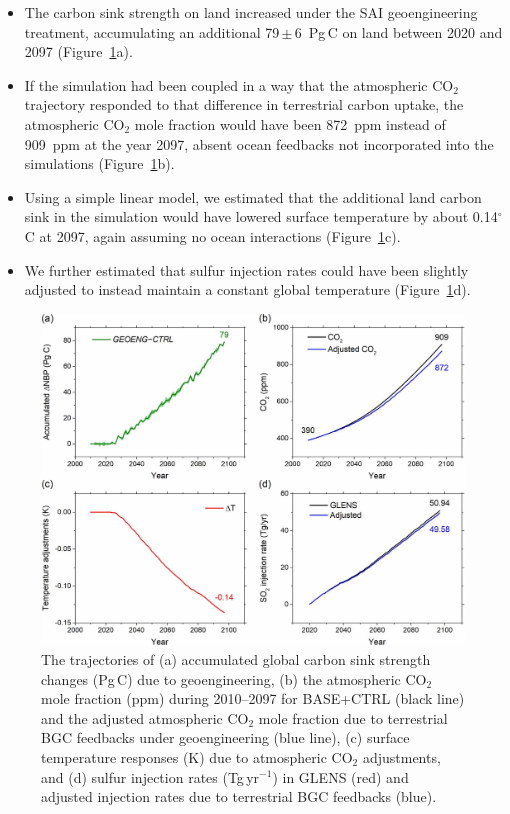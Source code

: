 \begin{itemize}
	\item The carbon sink strength on land increased under the SAI geoengineering treatment, accumulating an additional 79\,$\pm$\,6~Pg\,C on land between 2020 and 2097 (Figure~\ref{fig:geoeng_CO2_SO2}a).

	\item If the simulation had been coupled in a way that the atmospheric CO$_2$ trajectory responded to that difference in terrestrial carbon uptake, the atmospheric CO$_2$ mole fraction would have been 872~ppm instead of 909~ppm at the year 2097, absent ocean feedbacks not incorporated into the simulations (Figure~\ref{fig:geoeng_CO2_SO2}b).

	\item Using a simple linear model, we estimated that the additional land carbon sink in the simulation would have lowered surface temperature by about 0.14$^\circ$C at 2097, again assuming no ocean interactions (Figure~\ref{fig:geoeng_CO2_SO2}c).

	\item We further estimated that sulfur injection rates could have been slightly adjusted to instead maintain a constant global temperature (Figure~\ref{fig:geoeng_CO2_SO2}d).
\end{itemize}

\begin{figure}
	\begin{center}
		\includegraphics[width=0.85\columnwidth]{erl_figures/Fig4.jpg}
	\end{center}
	\caption{The trajectories of (a) accumulated global carbon sink strength changes (Pg\,C) due to geoengineering, (b) the atmospheric CO$_2$ mole fraction (ppm) during 2010--2097 for BASE+CTRL (black line) and the adjusted atmospheric CO$_2$ mole fraction due to terrestrial BGC feedbacks under geoengineering (blue line), (c) surface temperature responses (K) due to atmospheric CO$_2$ adjustments, and (d) sulfur injection rates (Tg\,yr$^{-1}$) in GLENS (red) and adjusted injection rates due to terrestrial BGC feedbacks (blue).
	}\label{fig:geoeng_CO2_SO2}
\end{figure}

